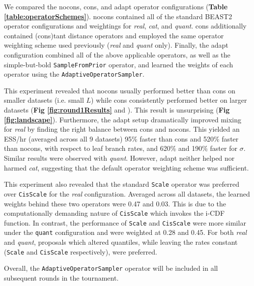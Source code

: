 \documentclass[10pt,letterpaper]{article}
\begin{document}
We compared the nocons, cons, and adapt operator configurations (\textbf{Table \ref{table:operatorSchemes}}).
nocons contained all of the standard BEAST2 operator configurations and weightings for \textit{real}, \textit{cat}, and \textit{quant}.
cons additionally contained (cons)tant distance operators and employed the same operator weighting scheme used previously \cite{zhang2020improving} (\textit{real} and \textit{quant} only). 
Finally, the adapt configuration combined all of the above applicable operators, as well as the simple-but-bold \texttt{SampleFromPrior} operator, and learned the weights of each operator using the  \texttt{AdaptiveOperatorSampler}.



This experiment revealed that nocons usually performed better than cons on smaller datasets (i.e. small $L$) while cons consistently performed better on larger datasets (\textbf{Fig \ref{fig:round1Results}} and \textbf{}). 
This result is unsurprising (\textbf{Fig \ref{fig:landscape}}).
Furthermore, the adapt setup dramatically improved mixing for \textit{real} by finding the right balance between cons and nocons.
This yielded an ESS/hr (averaged across all 9 datasets) 95\% faster than cons and 520\% faster than nocons, with respect to leaf branch rates, and 620\% and 190\% faster for $\sigma$.
Similar results were observed with \textit{quant}.
However, adapt neither helped nor harmed \textit{cat}, suggesting that the default operator weighting scheme was sufficient.


This experiment also revealed that the standard \texttt{Scale} operator was preferred over \texttt{CisScale} for the \textit{real} configuration. Averaged across all datasets, the learned weights behind these two operators were 0.47 and 0.03.
This is due to the computationally demanding nature of \texttt{CisScale} which invokes the i-CDF function.
In contrast, the performance of \texttt{Scale} and \texttt{CisScale} were more similar under the \texttt{quant} configuration and were weighted at 0.28 and 0.45.
For both \textit{real} and \textit{quant}, proposals which altered quantiles, while leaving the rates constant (\texttt{Scale} and \texttt{CisScale} respectively), were preferred.


Overall, the \texttt{AdaptiveOperatorSampler} operator will be included in all subsequent rounds in the tournament. 
\end{document}
